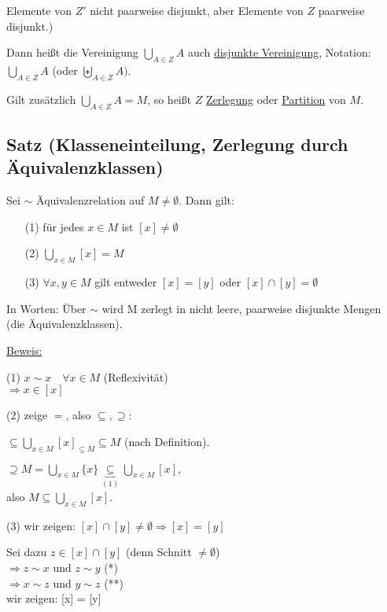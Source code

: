 \documentclass[a4paper, 12pt, twoside] {article}
\begin{document}
Elemente von $Z'$ nicht paarweise disjunkt, aber Elemente von $Z$ paarweise disjunkt.)

Dann heißt die Vereinigung $\displaystyle\bigcup_{A \in Z} A$ auch \underline{disjunkte Vereinigung},
Notation: $\displaystyle\bigcup_{A \in Z} A$ (oder $\displaystyle\biguplus_{A \in Z} A)$.

Gilt zusätzlich $\displaystyle\bigcup_{A \in Z} A = M$, so heißt $Z$ \underline{Zerlegung} oder \underline{Partition} von $M$.

\subsection{Satz (Klasseneinteilung, Zerlegung durch Äquivalenzklassen)} %
Sei $\sim$ Äquivalenzrelation auf $M \neq \emptyset$. Dann gilt:

\begin{itemize}
\item [(1)] für jedes $x \in M$ ist $[x] \neq \emptyset$
\item [(2)] $\displaystyle\bigcup_{x \in M} [x] = M$
\item [(3)] $\forall x, y \in M$ gilt entweder $[x] = [y]$ oder $[x] \cap [y] = \emptyset$
\end{itemize}

In Worten: Über $\sim$ wird M zerlegt in nicht leere, paarweise disjunkte Mengen (die Äquivalenzklassen).

\underline{Beweis:}

(1) $x \sim x \quad \forall x \in M$ (Reflexivität) \\
$\Rightarrow x \in [x]$

(2) zeige $=$, also $\subseteq, \supseteq$:

$\subseteq \displaystyle\bigcup_{x \in M} [x]_{\subseteq M} \subseteq M$ (nach Definition).

$\supseteq M = \displaystyle\bigcup_{x \in M} \{x\} \underbrace{\subseteq}_{(1)} \displaystyle\bigcup_{x \in M} [x],$ \\
also $M \subseteq \displaystyle\bigcup_{x \in M} [x]$.

(3) wir zeigen: $[x] \cap [y] \neq \emptyset \Rightarrow [x] = [y]$

Sei dazu $z \in [x] \cap [y]$ (denn Schnitt $\neq \emptyset$) \\
$\Rightarrow z \sim x$ und $z \sim y$ (*) \\
$\Rightarrow x \sim z$ und $y \sim z$ (**) \\
wir zeigen: [x] = [y]
\end{document}
